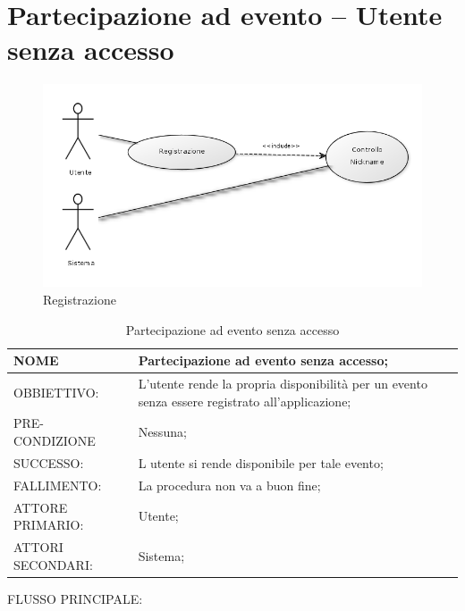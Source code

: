 \section{Partecipazione ad evento – Utente senza accesso }
\begin{figure}[h!]
\centering
\includegraphics[scale=0.55]{img/registrazione.png}
\caption{Registrazione}
\label{fig:registrazione}
\end{figure}
\begin{table}[H]
\begin{tabular}{p{}|p{}}
\toprule
NOME & Partecipazione ad evento senza accesso;\\
\hline
OBBIETTIVO: & L'utente rende la propria disponibilità per un evento senza essere registrato all'applicazione;\\
\hline
PRE-CONDIZIONE & Nessuna;\\
\hline
SUCCESSO: & L utente si rende disponibile per tale evento;\\
\hline
FALLIMENTO: & La procedura non va a buon fine;\\
\hline
ATTORE PRIMARIO: & Utente;\\
\hline
ATTORI SECONDARI: & Sistema;\\
\bottomrule
\end{tabular}
\caption{Partecipazione ad evento senza accesso}
\label{table:par1}
\end{table}
FLUSSO PRINCIPALE:
